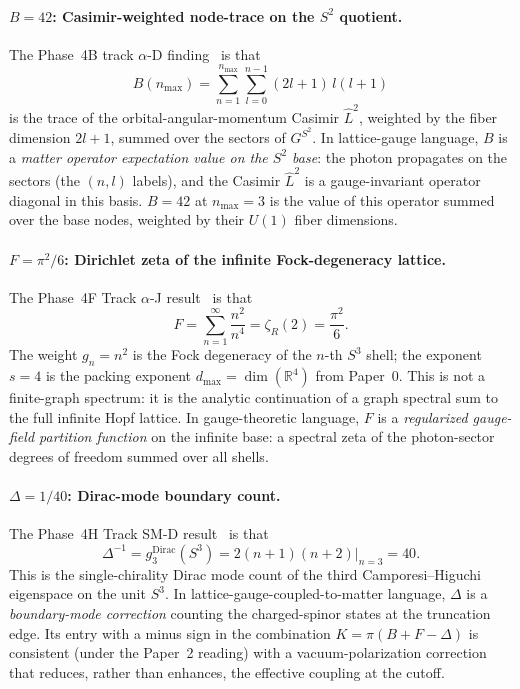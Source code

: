 \documentclass[aps,pra,twocolumn,superscriptaddress,longbibliography]{revtex4-2}
\begin{document}
\paragraph*{$B = 42$: Casimir-weighted node-trace on the $S^2$
quotient.}  The Phase~4B track $\alpha$-D finding~\cite{Paper2} is
that
\begin{equation}
B(n_{\max}) = \sum_{n=1}^{n_{\max}} \sum_{l=0}^{n-1}
  (2l+1)\,l(l+1)
\label{eq:B_casimir}
\end{equation}
is the trace of the orbital-angular-momentum Casimir $\hat{L}^2$,
weighted by the fiber dimension $2l+1$, summed over the sectors of
$G^{S^2}$.  In lattice-gauge language, $B$ is a \emph{matter
operator expectation value on the $S^2$ base}: the photon propagates
on the sectors (the $(n, l)$ labels), and the Casimir
$\hat{L}^2$ is a gauge-invariant operator diagonal in this basis.
$B = 42$ at $n_{\max} = 3$ is the value of this operator summed over
the base nodes, weighted by their $U(1)$ fiber dimensions.

\paragraph*{$F = \pi^2 / 6$: Dirichlet zeta of the infinite
Fock-degeneracy lattice.}  The Phase~4F Track $\alpha$-J
result~\cite{Paper2} is that
\begin{equation}
F = \sum_{n=1}^{\infty} \frac{n^2}{n^4}
  = \zeta_R(2) = \frac{\pi^2}{6}.
\label{eq:F_zeta}
\end{equation}
The weight $g_n = n^2$ is the Fock degeneracy of the $n$-th $S^3$
shell; the exponent $s = 4$ is the packing exponent
$d_{\max} = \dim(\mathbb{R}^4)$ from Paper~0.  This is not a
finite-graph spectrum: it is the analytic continuation of a graph
spectral sum to the full infinite Hopf lattice.  In gauge-theoretic
language, $F$ is a \emph{regularized gauge-field partition function}
on the infinite base: a spectral zeta of the photon-sector degrees
of freedom summed over all shells.

\paragraph*{$\Delta = 1/40$: Dirac-mode boundary count.} The Phase~4H
Track SM-D result~\cite{Paper2} is that
\begin{equation}
\Delta^{-1} = g_3^{\mathrm{Dirac}}(S^3)
  = 2(n+1)(n+2)\bigg|_{n=3} = 40.
\label{eq:Delta_dirac}
\end{equation}
This is the single-chirality Dirac mode count of the third
Camporesi--Higuchi eigenspace on the unit $S^3$.  In
lattice-gauge-coupled-to-matter language, $\Delta$ is a
\emph{boundary-mode correction} counting the charged-spinor states at
the truncation edge.  Its entry with a minus sign in the combination
$K = \pi(B + F - \Delta)$ is consistent (under the Paper~2 reading)
with a vacuum-polarization correction that reduces, rather than
enhances, the effective coupling at the cutoff.
\end{document}
